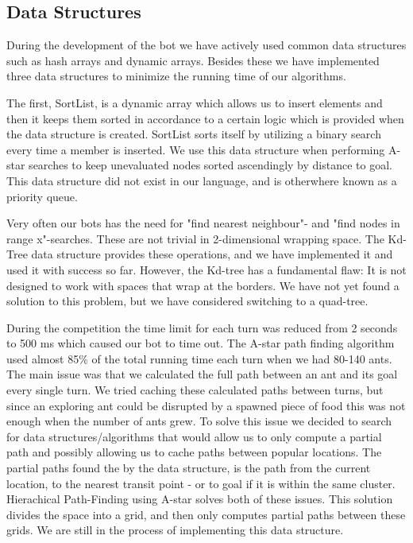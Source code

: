 \subsection{Data Structures}
\label{sec:datastructures}
During the development of the bot we have actively used common data structures such as hash arrays and dynamic arrays. Besides these we have implemented three data structures to minimize the running time of our algorithms.

The first, SortList, is a dynamic array which allows us to insert elements and then it keeps them sorted in accordance to a certain logic which is provided when the data structure is created. SortList sorts itself by utilizing a binary search every time a member is inserted. We use this data structure when performing A-star searches to keep unevaluated nodes sorted ascendingly by distance to goal. This data structure did not exist in our language, and is otherwhere known as a priority queue.

Very often our bots has the need for "find nearest neighbour"- and "find nodes in range x"-searches. These are not trivial in 2-dimensional wrapping space. The Kd-Tree data structure provides these operations, and we have implemented it and used it with success so far. However, the Kd-tree has a fundamental flaw: It is not designed to work with spaces that wrap at the borders. We have not yet found a solution to this problem, but we have considered switching to a quad-tree.

During the competition the time limit for each turn was reduced from 2 seconds to 500 ms which caused our bot to time out. The A-star path finding algorithm used almost 85\% of the total running time each turn when we had 80-140 ants. The main issue was that we calculated the full path between an ant and its goal every single turn. We tried caching these calculated paths between turns, but since an exploring ant could be disrupted by a spawned piece of food this was not enough when the number of ants grew. To solve this issue we decided to search for data structures/algorithms that would allow us to only compute a partial path and possibly allowing us to cache paths between popular locations. The partial paths found the by the data structure, is the path from the current location, to the nearest transit point - or to goal if it is within the same cluster.  Hierachical Path-Finding using A-star solves both of these issues. This solution divides the space into a grid, and then only computes partial paths between these grids. We are still in the process of implementing this data structure.